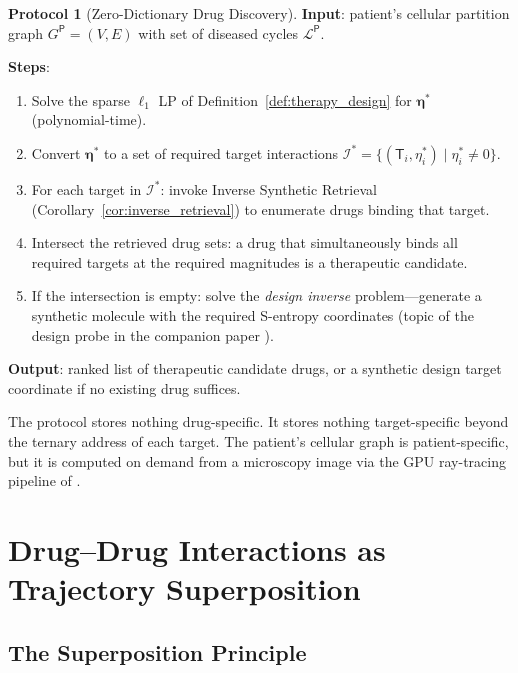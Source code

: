\documentclass[11pt,twocolumn,a4paper]{article}
\theoremstyle{definition}
\newtheorem{protocol}[theorem]{Protocol}
\theoremstyle{remark}
\newcommand{\Target}{\mathsf{T}}
\newcommand{\Patient}{\mathsf{P}}
\begin{document}
\begin{protocol}[Zero-Dictionary Drug Discovery]
\label{prot:zero_dict_discovery}
\textbf{Input}: patient's cellular partition graph $G^\Patient = (V, E)$ with set of diseased cycles $\mathcal{L}^\Patient$.

\textbf{Steps}:
\begin{enumerate}[nosep,leftmargin=*]
\item Solve the sparse $\ell_1$ LP of Definition~\ref{def:therapy_design} for $\boldsymbol{\eta}^*$ (polynomial-time).
\item Convert $\boldsymbol{\eta}^*$ to a set of required target interactions $\mathcal{I}^* = \{(\Target_i, \eta^*_i) \mid \eta^*_i \neq 0\}$.
\item For each target in $\mathcal{I}^*$: invoke Inverse Synthetic Retrieval (Corollary~\ref{cor:inverse_retrieval}) to enumerate drugs binding that target.
\item Intersect the retrieved drug sets: a drug that simultaneously binds all required targets at the required magnitudes is a therapeutic candidate.
\item If the intersection is empty: solve the \emph{design inverse} problem---generate a synthetic molecule with the required S-entropy coordinates (topic of the design probe in the companion paper \citep{sachikonye2025g}).
\end{enumerate}

\textbf{Output}: ranked list of therapeutic candidate drugs, or a synthetic design target coordinate if no existing drug suffices.
\end{protocol}

The protocol stores nothing drug-specific. It stores nothing target-specific beyond the ternary address of each target. The patient's cellular graph is patient-specific, but it is computed on demand from a microscopy image via the GPU ray-tracing pipeline of \citep{sachikonye2025f}.

\section{Drug--Drug Interactions as Trajectory Superposition}
\label{sec:ddi}

\subsection{The Superposition Principle}
\end{document}
